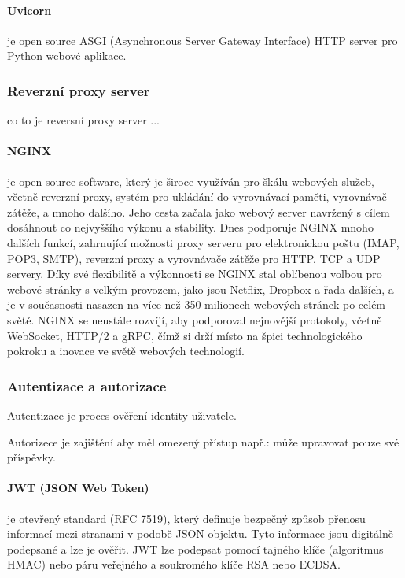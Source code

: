 \documentclass[12pt, a4paper]{article}
\begin{document}
\paragraph{Uvicorn} je open source ASGI (Asynchronous Server Gateway Interface) HTTP server pro Python webové aplikace.
\cite{encode_oss_uvicorn_nodate}
\subsubsection{Reverzní proxy server}
co to je reversní proxy server ...
\paragraph{NGINX}
je open-source software, který je široce využíván pro škálu webových služeb, včetně reverzní proxy, systém pro ukládání do vyrovnávací paměti, vyrovnávač zátěže, a mnoho dalšího. Jeho cesta začala jako  webový server navržený s cílem dosáhnout co nejvyššího výkonu a stability. Dnes podporuje NGINX mnoho dalších funkcí, zahrnující možnosti proxy serveru pro elektronickou poštu (IMAP, POP3, SMTP), reverzní proxy a vyrovnávače zátěže pro HTTP, TCP a UDP servery. Díky své flexibilitě a výkonnosti se NGINX stal oblíbenou volbou pro webové stránky s velkým provozem, jako jsou Netflix, Dropbox a řada dalších, a je v současnosti nasazen na více než 350 milionech webových stránek po celém světě. NGINX se neustále rozvíjí, aby podporoval nejnovější protokoly, včetně WebSocket, HTTP/2 a gRPC, čímž si drží místo na špici technologického pokroku a inovace ve světě webových technologií.
\cite{f5_nginx_nodate}
\subsubsection{Autentizace a autorizace}
Autentizace je proces ověření identity uživatele.

Autorizece je zajištění aby měl omezený přístup např.: může upravovat pouze své příspěvky.
\paragraph{JWT (JSON Web Token)}
je otevřený standard (RFC 7519), který definuje bezpečný způsob přenosu informací mezi stranami v podobě JSON objektu. Tyto informace jsou digitálně podepsané a lze je ověřit. JWT lze podepsat pomocí tajného klíče (algoritmus HMAC) nebo páru veřejného a soukromého klíče RSA nebo ECDSA.
\cite{jones_json_2015}
\cite{okta_json_nodate}
\end{document}
